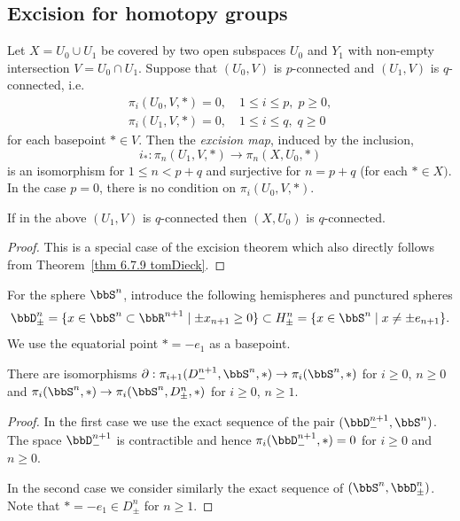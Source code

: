 \subsection{Excision for homotopy groups}

\begin{thm}
    Let $X=U_0\cup U_1$ be covered by two open subspaces $U_0$ and $Y_1$ with non-empty intersection $V=U_0\cap U_1$. Suppose that $(U_0,V)$ is $p$-connected and $(U_1,V)$ is $q$-connected, i.e.
    \[
    \begin{matrix}
        \pi_i(U_0,V,*)=0,\quad 1\leq i\leq p,\; p\geq 0,\\
        \pi_i(U_1,V,*)=0,\quad 1\leq i\leq q,\; q\geq 0
    \end{matrix}
    \]
    for each basepoint $*\in V$. Then the \emph{excision map}, induced by the inclusion,
    \[i_\ast : \pi_n(U_1,V,*)\to \pi_n(X,U_0,*)\]
    is an isomorphism for $1\leq n <p+q$ and surjective for $n=p+q$ (for each $*\in X)$. In the case $p=0$, there is no condition on $\pi_i(U_0,V,*)$.
\end{thm}

\begin{cor}\label{prop 6.4.2 tomDieck}
    If in the above $(U_1,V)$ is $q$-connected then $(X,U_0)$ is $q$-connected.
\end{cor}
\begin{proof}
    This is a special case of the excision theorem which also directly follows from Theorem~\ref{thm 6.7.9 tomDieck}.
\end{proof}

For the sphere $\bbS^n$, introduce the following hemispheres and punctured spheres
\[\bbD^n_\pm=\{x\in \bbS^n\subset \bbR^{n+1}\mid \pm x_{n+1}\geq 0\}\subset H^n_\pm=\{x\in \bbS^n\mid x\neq \pm e_{n+1}\}.\]
We use the equatorial point $*=-e_1$ as a basepoint.

\begin{lem}\label{lem 6.4.3 tomDieck}
   There are isomorphisms $\partial:\pi_{i+1}(D_-^{n+1},\bbS^n,*)\to \pi_i(\bbS^n,*)$ for $i\geq 0$, $n\geq 0$ and $\pi_i(\bbS^n,*)\to \pi_i(\bbS^n,D_\pm^n,*)$ for $i\geq 0$, $n\geq 1$.
\end{lem}
\begin{proof}
    In the first case we use the exact sequence of the pair $(\bbD^{n+1}_-,\bbS^n)$. The space $\bbD^{n+1}_-$ is contractible and hence $\pi_i(\bbD^{n+1}_-,*)=0$ for $i\geq 0$ and $n\geq 0$.

    In the second case we consider similarly the exact sequence of $(\bbS^n,\bbD^n_\pm)$. Note that $*=-e_1\in D_\pm^n$ for $n\geq 1$.
\end{proof}

